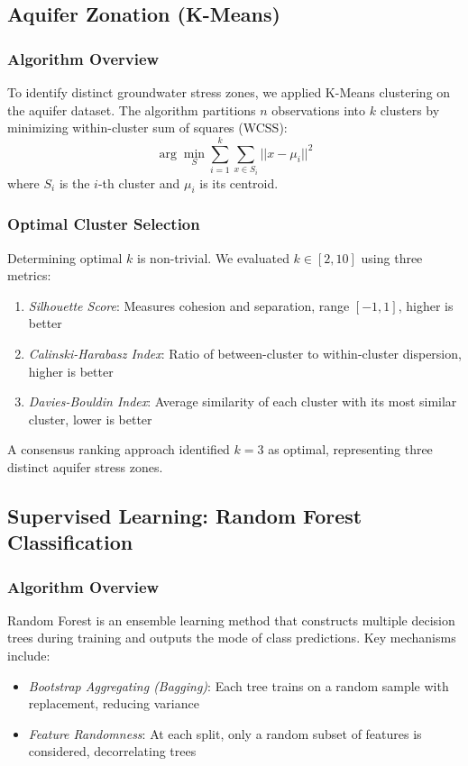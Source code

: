 \documentclass[conference]{IEEEtran}
\begin{document}
\subsection{Aquifer Zonation (K-Means)}
\subsubsection{Algorithm Overview}
To identify distinct groundwater stress zones, we applied K-Means clustering on the aquifer dataset. The algorithm partitions $n$ observations into $k$ clusters by minimizing within-cluster sum of squares (WCSS):
\begin{equation}
\arg\min_{S} \sum_{i=1}^{k} \sum_{x \in S_i} ||x - \mu_i||^2
\end{equation}
where $S_i$ is the $i$-th cluster and $\mu_i$ is its centroid.

\subsubsection{Optimal Cluster Selection}
Determining optimal $k$ is non-trivial. We evaluated $k \in [2, 10]$ using three metrics:
\begin{enumerate}
\item \textit{Silhouette Score}: Measures cohesion and separation, range $[-1, 1]$, higher is better
\item \textit{Calinski-Harabasz Index}: Ratio of between-cluster to within-cluster dispersion, higher is better
\item \textit{Davies-Bouldin Index}: Average similarity of each cluster with its most similar cluster, lower is better
\end{enumerate}

A consensus ranking approach identified $k=3$ as optimal, representing three distinct aquifer stress zones.

\subsection{Supervised Learning: Random Forest Classification}

\subsubsection{Algorithm Overview}
Random Forest is an ensemble learning method that constructs multiple decision trees during training and outputs the mode of class predictions. Key mechanisms include:
\begin{itemize}
\item \textit{Bootstrap Aggregating (Bagging)}: Each tree trains on a random sample with replacement, reducing variance
\item \textit{Feature Randomness}: At each split, only a random subset of features is considered, decorrelating trees
\end{itemize}
\end{document}
